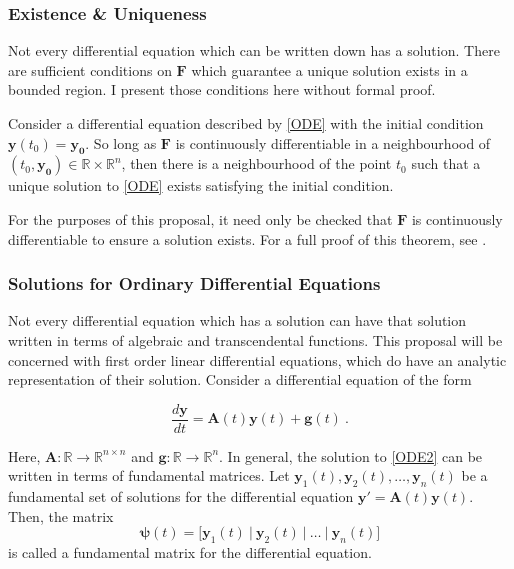 \subsubsection{Existence \& Uniqueness}

Not every differential equation which can be written down has a solution. There are sufficient conditions on $\mathbf{F}$ which guarantee a unique solution exists in a bounded region.  I present those conditions here without formal proof.

Consider a differential equation described by \cref{ODE} with the initial condition  $ \mathbf{y}(t_0) = \mathbf{y_0} $. So long as $\mathbf{F}$ is continuously differentiable in a neighbourhood of $ (t_0, \mathbf{y_0}) \in \mathbb{R}\times\mathbb{R}^n $, then there is a neighbourhood of the point $ t_0 $ such that a unique solution to \cref{ODE} exists satisfying the initial condition.

For the purposes of this proposal, it need only be checked that $ \mathbf{F} $ is continuously differentiable to ensure a solution exists.  For a full proof of this theorem, see \cite{miller1982ordinary,morris1963ordinary}.

\subsubsection{Solutions for Ordinary Differential Equations}

Not every differential equation which has a solution can have that solution written in terms of algebraic and transcendental functions.  This proposal will be concerned with first order linear differential equations, which do have an analytic representation of their solution.  Consider a differential equation of the form

\begin{equation}\label{ODE2}
\dfrac{d\mathbf{y}}{dt} = \mathbf{A}(t)\mathbf{y}(t) + \mathbf{g}(t) \>.
\end{equation}

Here, $ \mathbf{A}: \mathbb{R} \rightarrow \mathbb{R}^{n \times n} $ and $ \mathbf{g}:  \mathbb{R} \rightarrow \mathbb{R}^n $.  In general, the solution to \cref{ODE2} can be written in terms of fundamental matrices.  Let $ \mathbf{y}_1(t), \mathbf{y}_{2}(t), \dots , \mathbf{y}_{n}(t) $ be a fundamental set of solutions for the differential equation $ \mathbf{y}' = \mathbf{A}(t)\mathbf{y}(t) $.  Then, the matrix
%
\begin{equation*}
\bm{\psi} (t)= \Big[\mathbf{y}_{1}(t) \>\vert\> \mathbf{y}_{2}(t) \>\vert\> \dots \>\vert\> \mathbf{y}_{n}(t)\Big]
\end{equation*}
% 
is called a fundamental  matrix for the differential equation.


